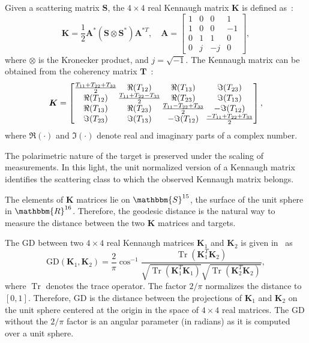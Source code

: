 \documentclass[journal]{IEEEtran}
\DeclareMathOperator{\Tr}{Tr}
\begin{document}
Given a scattering matrix $\bm{S}$, the $4 \times 4$ real Kennaugh matrix $\bm{K}$ is defined as~\cite{Pottier09}:
\begin{equation}
	\bm{K} = \frac{1}{2}\bm{A}^*(\bm{S} \otimes \bm{S}^*) \bm{A}^{*T}, \quad \bm{A} = 
	\begin{bmatrix}
		1 & 0 & 0 & 1\\
		1 & 0 & 0 & -1\\
		0 & 1 & 1 & 0\\
		0 & j & -j & 0
	\end{bmatrix},
\end{equation}
where $\otimes$ is the Kronecker product, and  $j = \sqrt{-1}$.
The Kennaugh matrix can be obtained from the coherency matrix $\bm{T}$~\cite{PolarisationApplicationsRemoteSensing}:
\begin{equation}
	\label{incoKen}
	\bm{K} =
\arraycolsep=.7pt
	\begin{bmatrix}
		\frac{T_{11}+T_{22}+ T_{33}}{2} & \Re(T_{12}) & \Re(T_{13}) & \Im(T_{23})\\
		\Re(T_{12}) & \frac{T_{11}+T_{22}-T_{33}}{2} & \Re(T_{23}) & \Im(T_{13})\\
		\Re(T_{13}) & \Re(T_{23}) & \frac{T_{11}-T_{22}+T_{33}}{2} & - \Im(T_{12})\\
		\Im(T_{23}) & \Im(T_{13}) & - \Im(T_{12}) &\frac{-T_{11}+T_{22}+T_{33}}{2}
	\end{bmatrix},
\end{equation}
where $\Re(\cdot)$ and $\Im(\cdot)$ denote real and imaginary parts of a complex number. 

The polarimetric nature of the target is preserved under the scaling of measurements. 
In this light, the unit normalized version of a Kennaugh matrix identifies the scattering class to which the observed Kennaugh matrix belongs.

The elements of $\bm{K}$ matrices lie on $\mathbbm{S}^{15}$, the surface of the unit sphere in $\mathbbm{R}^{16}$. 
Therefore, the geodesic distance is the natural way to measure the distance between the two $\bm{K}$ matrices and targets. 

The $\text{GD}$ between two $4 \times 4$ real Kennaugh matrices $\bm{K}_1$ and $\bm{K}_2$ is given in~\cite{APolSARScatteringPowerFactorizationFrameworkandNovelRollInvariantParametersBasedUnsupervisedClassificationSchemeUsingaGeodesicDistanceinpress} as
\begin{equation}
	\text{GD}(\bm{K}_1,\bm{K}_2) =  \frac{2}{\pi} \cos^{-1}\frac{\Tr(\bm{K}_1^T\bm{K}_2)}{\sqrt{\Tr(\bm{K}_1^T\bm{K}_1)}\sqrt{\Tr(\bm{K}_2^T\bm{K}_2)}} ,
	\label{eq:GD_Ken}
\end{equation}
where $\Tr$ denotes the trace operator. 
The factor $2/\pi$ normalizes the distance to $[0,1]$. 
Therefore, $\text{GD}$ is the distance between the projections of $\bm{K}_1$ and $\bm{K}_2$ on the unit sphere centered at the origin in the space of $4 \times 4$ real matrices. 
The $\text{GD}$ without the $2/\pi$ factor is an angular parameter (in radians) as it is computed over a unit sphere. 
\end{document}
